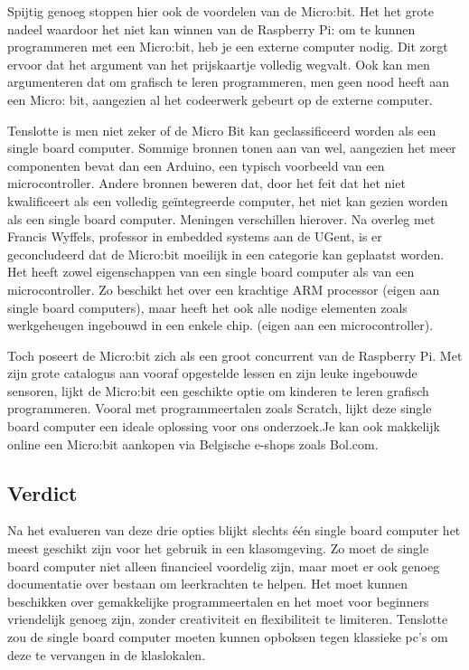 Spijtig genoeg stoppen hier ook de voordelen van de Micro:bit. Het het grote nadeel waardoor het niet kan winnen van de Raspberry Pi: om te kunnen programmeren met een Micro:bit, heb je een externe computer nodig. Dit zorgt ervoor dat het argument van het prijskaartje volledig wegvalt. Ook kan men argumenteren dat om grafisch te leren programmeren, men geen nood heeft aan een Micro: bit, aangezien al het codeerwerk gebeurt op de externe computer.\cite{Singapore}

Tenslotte is men niet zeker of de Micro Bit kan geclassificeerd worden als een single board computer. Sommige bronnen tonen aan van wel, aangezien het meer componenten bevat dan een Arduino, een typisch voorbeeld van een microcontroller. Andere bronnen beweren dat, door het feit dat het niet kwalificeert als een volledig geïntegreerde computer, het niet kan gezien worden als een single board computer. Meningen verschillen hierover. 
Na overleg met Francis Wyffels, professor in embedded systems aan de UGent, is er geconcludeerd dat de Micro:bit moeilijk in een categorie kan geplaatst worden. Het heeft zowel eigenschappen van een single board computer als van een microcontroller. Zo beschikt het over een krachtige ARM processor (eigen aan single board computers), maar heeft het ook alle nodige elementen zoals werkgeheugen ingebouwd in een enkele chip. (eigen aan een microcontroller). 

Toch poseert de Micro:bit zich als een groot concurrent van de Raspberry Pi. Met zijn grote catalogus aan vooraf opgestelde lessen en zijn leuke ingebouwde sensoren, lijkt de Micro:bit een geschikte optie om kinderen te leren grafisch programmeren. Vooral met programmeertalen zoals Scratch, lijkt deze single board computer een ideale oplossing voor ons onderzoek.Je kan ook makkelijk online een Micro:bit aankopen via Belgische e-shops zoals Bol.com. 

\subsection{Verdict}

Na het evalueren van deze drie opties blijkt slechts één single board computer het meest geschikt zijn voor het gebruik in een klasomgeving. Zo moet de single board computer niet alleen financieel voordelig zijn, maar moet er ook genoeg documentatie over bestaan om leerkrachten te helpen. Het moet kunnen beschikken over gemakkelijke programmeertalen en het moet voor beginners vriendelijk genoeg zijn, zonder creativiteit en flexibiliteit te limiteren.
Tenslotte zou de single board computer moeten kunnen opboksen tegen klassieke pc’s om deze te vervangen in de klaslokalen.

